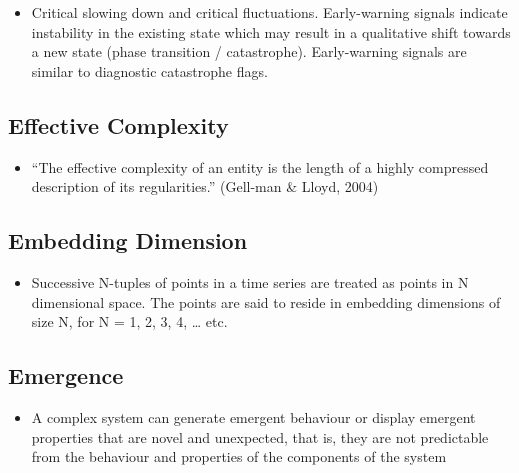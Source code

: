 \documentclass[12pt,]{book}
\providecommand{\tightlist}{%
  \setlength{\itemsep}{0pt}\setlength{\parskip}{0pt}}
\begin{document}
\begin{itemize}
\tightlist
\item
  Critical slowing down and critical fluctuations. Early-warning signals indicate instability in the existing state which may result in a qualitative shift towards a new state (phase transition / catastrophe). Early-warning signals are similar to diagnostic catastrophe flags.
\end{itemize}

\hypertarget{Effe24}{%
\subsection*{\texorpdfstring{\textbf{Effective Complexity}}{Effective Complexity}}\label{Effe24}}

\begin{itemize}
\tightlist
\item
  ``The effective complexity of an entity is the length of a highly compressed description of its regularities.'' (Gell-man \& Lloyd, 2004)
\end{itemize}

\hypertarget{Embe25}{%
\subsection*{\texorpdfstring{\textbf{Embedding Dimension}}{Embedding Dimension}}\label{Embe25}}

\begin{itemize}
\tightlist
\item
  Successive N-tuples of points in a time series are treated as points in N dimensional space. The points are said to reside in embedding dimensions of size N, for N = 1, 2, 3, 4, \ldots{} etc.
\end{itemize}

\hypertarget{Emer26}{%
\subsection*{\texorpdfstring{\textbf{Emergence}}{Emergence}}\label{Emer26}}

\begin{itemize}
\tightlist
\item
  A complex system can generate emergent behaviour or display emergent properties that are novel and unexpected, that is, they are not predictable from the behaviour and properties of the components of the system
\end{itemize}
\end{document}
